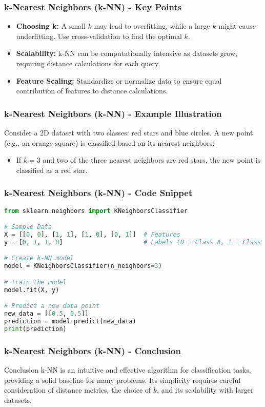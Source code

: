 \documentclass[aspectratio=169]{beamer}
\begin{document}
\begin{frame}[fragile]
    \frametitle{k-Nearest Neighbors (k-NN) - Key Points}
    \begin{itemize}
        \item \textbf{Choosing k:} A small $k$ may lead to overfitting, while a large $k$ might cause underfitting. Use cross-validation to find the optimal $k$.
        \item \textbf{Scalability:} k-NN can be computationally intensive as datasets grow, requiring distance calculations for each query.
        \item \textbf{Feature Scaling:} Standardize or normalize data to ensure equal contribution of features to distance calculations.
    \end{itemize}
\end{frame}

\begin{frame}[fragile]
    \frametitle{k-Nearest Neighbors (k-NN) - Example Illustration}
    Consider a 2D dataset with two classes: red stars and blue circles. A new point (e.g., an orange square) is classified based on its nearest neighbors:
    \begin{itemize}
        \item If $k=3$ and two of the three nearest neighbors are red stars, the new point is classified as a red star.
    \end{itemize}
\end{frame}

\begin{frame}[fragile]
    \frametitle{k-Nearest Neighbors (k-NN) - Code Snippet}
    \begin{lstlisting}[language=Python]
from sklearn.neighbors import KNeighborsClassifier

# Sample Data
X = [[0, 0], [1, 1], [1, 0], [0, 1]]  # Features
y = [0, 1, 1, 0]                      # Labels (0 = Class A, 1 = Class B)

# Create k-NN model
model = KNeighborsClassifier(n_neighbors=3)

# Train the model
model.fit(X, y)

# Predict a new data point
new_data = [[0.5, 0.5]]
prediction = model.predict(new_data)
print(prediction)
    \end{lstlisting}
\end{frame}

\begin{frame}[fragile]
    \frametitle{k-Nearest Neighbors (k-NN) - Conclusion}
    \begin{block}{Conclusion}
        k-NN is an intuitive and effective algorithm for classification tasks, providing a solid baseline for many problems. 
        Its simplicity requires careful consideration of distance metrics, the choice of $k$, and its scalability with larger datasets.
    \end{block}
\end{frame}
\end{document}
